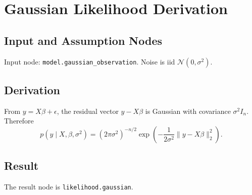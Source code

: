 \section{Gaussian Likelihood Derivation}
\label{deriv:gaussian-likelihood}

\subsection{Input and Assumption Nodes}
Input node: \texttt{model.gaussian\_observation}. Noise is iid \(\mathcal{N}(0,\sigma^2)\).

\subsection{Derivation}
From \(y=X\beta+\epsilon\), the residual vector \(y-X\beta\) is Gaussian with covariance \(\sigma^2 I_n\). Therefore
\[
  p(y\mid X,\beta,\sigma^2)
  =
  (2\pi\sigma^2)^{-n/2}
  \exp\left(-\frac{1}{2\sigma^2}\|y-X\beta\|_2^2\right).
\]

\subsection{Result}
The result node is \texttt{likelihood.gaussian}.

